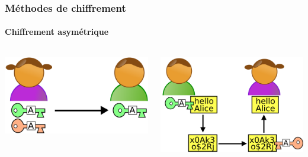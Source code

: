         \begin{frame}
            \frametitle{Méthodes de chiffrement}
            \framesubtitle{Chiffrement asymétrique}
            \begin{columns}
                \begin{column}{.4\linewidth}
                    \includegraphics[width=\linewidth]{rsc/asymetrique_1.png}
                \end{column}

                \begin{column}{.4\linewidth}
                    \includegraphics[width=\linewidth]{rsc/asymetrique_2.png}
                \end{column}
            \end{columns}
        \end{frame}

